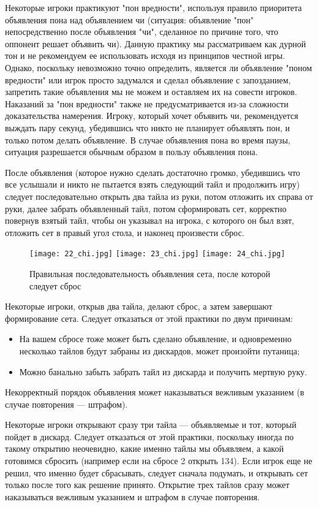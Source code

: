 Некоторые игроки практикуют "пон вредности", используя правило приоритета объявления пона над объявлением чи (ситуация: объявление "пон" непосредственно после объявления "чи", сделанное по причине того, что оппонент решает объявить чи). Данную практику мы рассматриваем как дурной тон и не рекомендуем ее использовать исходя из принципов честной игры. Однако, поскольку невозможно точно определить, является ли объявление "поном вредности" или игрок просто задумался и сделал объявление с запозданием, запретить такие объявления мы не можем и оставляем их на совести игроков. Наказаний за "пон вредности" также не предусматривается из-за сложности доказательства намерения. Игроку, который хочет объявить чи, рекомендуется выждать пару секунд, убедившись что никто не планирует объявлять пон, и только потом делать объявление. В случае объявления пона во время паузы, ситуация разрешается обычным образом в пользу объявления пона.

После объявления (которое нужно сделать достаточно громко, убедившись что все услышали и никто не пытается взять следующий тайл и продолжить игру) следует последовательно открыть два тайла из руки, потом отложить их справа от руки, далее забрать объявленный тайл, потом сформировать сет, корректно повернув взятый тайл, чтобы он указывал на игрока, с которого он был взят, отложить сет в правый угол стола, и наконец произвести сброс.

\begin{figure}[H]
	\centering
	\texttt{[image: 22\_chi.jpg]}
	\texttt{[image: 23\_chi.jpg]}
	\texttt{[image: 24\_chi.jpg]}
	\caption{Правильная последовательность объявления сета, после которой следует сброс}
\end{figure}

Некоторые игроки, открыв два тайла, делают сброс, а затем завершают формирование сета. Следует отказаться от этой практики по двум причинам:
\begin{itemize}
	\item На вашем сбросе тоже может быть сделано объявление, и одновременно несколько тайлов будут забраны из дискардов, может произойти путаница;
	\item Можно банально забыть забрать тайл из дискарда и получить мертвую руку.
\end{itemize}

Некорректный порядок объявления может наказываться вежливым указанием (в случае повторения --- штрафом).

Некоторые игроки открывают сразу три тайла --- объявляемые и тот, который пойдет в дискард. Следует отказаться от этой практики, поскольку иногда по такому открытию неочевидно, какие именно тайлы мы объявляем, а какой готовимся сбросить (например если на сбросе 2 открыть 134). Если игрок еще не решил, что именно будет сбрасывать, следует сначала подумать, и открывать сет только после того как решение принято. Открытие трех тайлов сразу может наказываться вежливым указанием и штрафом в случае повторения.


